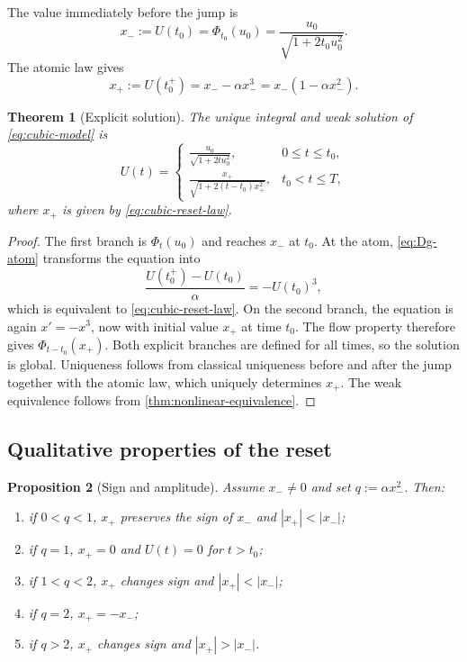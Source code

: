 \documentclass[preprint,12pt]{elsarticle}
\newtheorem{theorem}{Theorem}[section]
\newtheorem{proposition}[theorem]{Proposition}
\theoremstyle{definition}
\theoremstyle{remark}
\begin{document}
The value immediately before the jump is
\begin{equation}\label{eq:xminus}
 x_-:=U(t_0)=\Phi_{t_0}(u_0)
 =\frac{u_0}{\sqrt{1+2t_0u_0^2}}.
\end{equation}
The atomic law gives
\begin{equation}\label{eq:cubic-reset-law}
 x_+:=U(t_0^+)=x_--\alpha x_-^3
 =x_-(1-\alpha x_-^2).
\end{equation}

\begin{theorem}[Explicit solution]\label{thm:cubic-explicit}
The unique integral and weak solution of \eqref{eq:cubic-model} is
\begin{equation}\label{eq:cubic-explicit}
 U(t)=
 \begin{cases}
 \displaystyle\frac{u_0}{\sqrt{1+2tu_0^2}},&0\le t\le t_0,\\[3mm]
 \displaystyle\frac{x_+}{\sqrt{1+2(t-t_0)x_+^2}},&t_0<t\le T,
 \end{cases}
\end{equation}
where $x_+$ is given by \eqref{eq:cubic-reset-law}.
\end{theorem}

\begin{proof}
The first branch is $\Phi_t(u_0)$ and reaches $x_-$ at $t_0$. At the atom, \eqref{eq:Dg-atom} transforms the equation into
\[
 \frac{U(t_0^+)-U(t_0)}{\alpha}=-U(t_0)^3,
\]
which is equivalent to \eqref{eq:cubic-reset-law}. On the second branch, the equation is again $x'=-x^3$, now with initial value $x_+$ at time $t_0$. The flow property therefore gives $\Phi_{t-t_0}(x_+)$. Both explicit branches are defined for all times, so the solution is global. Uniqueness follows from classical uniqueness before and after the jump together with the atomic law, which uniquely determines $x_+$. The weak equivalence follows from \cref{thm:nonlinear-equivalence}.
\end{proof}

\subsection{Qualitative properties of the reset}

\begin{proposition}[Sign and amplitude]\label{prop:qualitative}
Assume $x_-\ne0$ and set $q:=\alpha x_-^2$. Then:
\begin{enumerate}[label=\roman*)]
 \item if $0<q<1$, $x_+$ preserves the sign of $x_-$ and $|x_+|<|x_-|$;
 \item if $q=1$, $x_+=0$ and $U(t)=0$ for $t>t_0$;
 \item if $1<q<2$, $x_+$ changes sign and $|x_+|<|x_-|$;
 \item if $q=2$, $x_+=-x_-$;
 \item if $q>2$, $x_+$ changes sign and $|x_+|>|x_-|$.
\end{enumerate}
\end{proposition}
\end{document}
